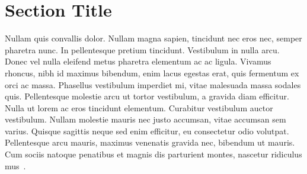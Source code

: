 
\section{Section Title} Nullam quis convallis dolor. Nullam magna sapien, tincidunt nec eros nec,
semper pharetra nunc. In pellentesque pretium tincidunt. Vestibulum in nulla arcu. Donec vel nulla
eleifend metus pharetra elementum ac ac ligula. Vivamus rhoncus, nibh id maximus bibendum, enim
lacus egestas erat, quis fermentum ex orci ac massa. Phasellus vestibulum imperdiet mi, vitae
malesuada massa sodales quis. Pellentesque molestie arcu ut tortor vestibulum, a gravida diam
efficitur. Nulla ut lorem ac eros tincidunt elementum. Curabitur vestibulum auctor vestibulum.
Nullam molestie mauris nec justo accumsan, vitae accumsan sem varius. Quisque sagittis neque sed
enim efficitur, eu consectetur odio volutpat. Pellentesque arcu mauris, maximus venenatis gravida
nec, bibendum ut mauris. Cum sociis natoque penatibus et magnis dis parturient montes, nascetur
ridiculus mus~\cite{SampleRef3}.  

\endinput


